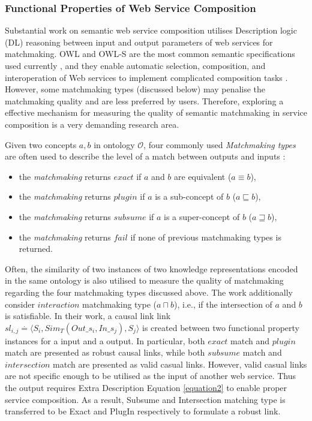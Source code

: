 \subsubsection{Functional Properties of Web Service Composition}
Substantial work \cite{bansal2016generalized,lecue2009optimizing, lecue2007making, lecue2006formal, rao2005semantic} on semantic web service composition utilises Description logic (DL) reasoning between input and output parameters of web services for matchmaking. OWL and OWL-S are the most common semantic specifications used currently \cite{petrie2016web}, and they enable automatic selection, composition, and interoperation of Web services to implement complicated composition tasks \cite{martin2004owl}. However, some matchmaking types (discussed below) may penalise the matchmaking quality and are less preferred by users. Therefore, exploring a effective mechanism for measuring the quality of semantic matchmaking in service composition is a very demanding research area.

Given two concepts $a, b$ in ontology $\mathcal{O}$, four commonly used \emph{Matchmaking types} are often used to describe the level of a match between outputs and inputs \cite{paolucci2002semantic}: 
\begin{itemize}
\item the \emph{matchmaking} returns $exact$ if $a$ and $b$ are equivalent ($a \equiv b$), 
\item the \emph{matchmaking} returns $plugin$ if $a$ is a sub-concept of $b$ ($a \sqsubseteq b$),
\item the \emph{matchmaking} returns $subsume$ if $a$ is a super-concept of $b$ ($a \sqsupseteq b$), 
\item the \emph{matchmaking} returns $fail$ if none of previous matchmaking types is returned. 
\end{itemize}

Often, the similarity of two instances of two knowledge representations encoded in the same ontology is also utilised to measure the quality of matchmaking regarding the four matchmaking types discussed above. The work \cite{lecue2007making} additionally consider $interaction$ matchmaking type ($a \sqcap b$), i.e., if the intersection of $a$ and $b$ is satisfiable. In their work, a causal link link \begin{math} sl_{i,j} \stackrel{.}{=} \langle S_i, Sim_{T}(Out\_s_i,In\_s_j),S_j  \rangle \end{math} is created between two functional property instances for a input and a output. In particular, both $exact$ match and $plugin$ match are presented as robust causal links, while both $subsume$ match and $intersection$ match are presented as valid casual links. However, valid casual links are not specific enough to be utilised as the input of another web service. Thus the output requires Extra Description Equation \ref{equation2} to enable proper service composition. As a result, Subsume and Intersection matching type is transferred to be Exact and PlugIn respectively to formulate a robust link. 

